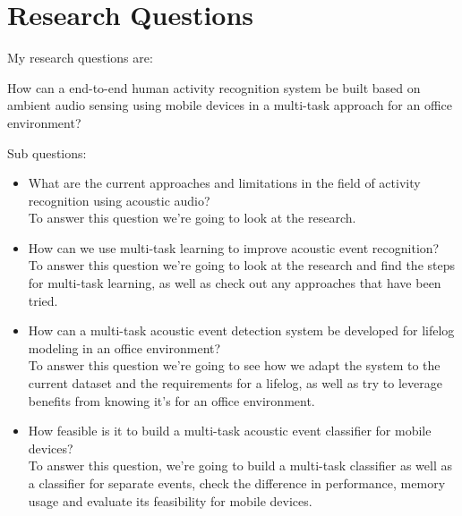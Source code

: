 \section{Research Questions}

My research questions are:

How can a end-to-end human activity recognition system be built based on ambient audio sensing using mobile devices in a multi-task approach for an office environment?

Sub questions:

\begin{itemize}
	\item What are the current approaches and limitations in the field of activity recognition using acoustic audio?\\
	To answer this question we're going to look at the research.
	\item How can we use multi-task learning to improve acoustic event recognition?\\
	To answer this question we're going to look at the research and find the steps for multi-task learning, as well as check out any approaches that have been tried.
	\item How can a multi-task acoustic event detection system be developed for lifelog modeling in an office environment?\\
	To answer this question we're going to see how we adapt the system to the current dataset and the requirements for a lifelog, as well as try to leverage benefits from knowing it's for an office environment.
	\item How feasible is it to build a multi-task acoustic event classifier for mobile devices? \\
	To answer this question, we're going to build a multi-task classifier as well as a classifier for separate events, check the difference in performance, memory usage and evaluate its feasibility for mobile devices.
\end{itemize}





